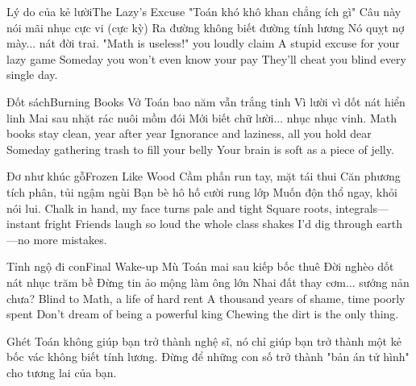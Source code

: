 \begin{tutuyetbox}{Lý do của kẻ lười}{The Lazy's Excuse}
"Toán khó khô khan chẳng ích gì"
Câu này nói mãi nhục cực vi (cực kỳ)
Ra đường không biết đường tính lương
Nó quỵt nợ mày... nát đời trai.
\tcblower
"Math is useless!" you loudly claim
A stupid excuse for your lazy game
Someday you won't even know your pay
They'll cheat you blind every single day.
\end{tutuyetbox}

\begin{tutuyetbox}{Đốt sách}{Burning Books}
Vở Toán bao năm vẫn trắng tinh
Vì lười vì dốt nát hiển linh
Mai sau nhặt rác nuôi mồm đói
Mới biết chữ lười... nhục nhục vinh.
\tcblower
Math books stay clean, year after year
Ignorance and laziness, all you hold dear
Someday gathering trash to fill your belly
Your brain is soft as a piece of jelly.
\end{tutuyetbox}

\begin{tutuyetbox}{Đơ như khúc gỗ}{Frozen Like Wood}
Cầm phấn run tay, mặt tái thui
Căn phương tích phân, tủi ngậm ngùi
Bạn bè hô hố cười rung lớp
Muốn độn thổ ngay, khỏi nói lui.
\tcblower
Chalk in hand, my face turns pale and tight
Square roots, integrals—instant fright
Friends laugh so loud the whole class shakes
I’d dig through earth—no more mistakes.
\end{tutuyetbox}

\begin{tutuyetbox}{Tỉnh ngộ đi con}{Final Wake-up}
Mù Toán mai sau kiếp bốc thuê
Đời nghèo dốt nát nhục trăm bề
Đừng tin ảo mộng làm ông lớn
Nhai đất thay cơm... sướng nản chưa?
\tcblower
Blind to Math, a life of hard rent
A thousand years of shame, time poorly spent
Don't dream of being a powerful king
Chewing the dirt is the only thing.
\end{tutuyetbox}
\begin{ghichu}
Ghét Toán không giúp bạn trở thành nghệ sĩ, nó chỉ giúp bạn trở thành một kẻ bốc vác không biết tính lương. Đừng để những con số trở thành "bản án tử hình" cho tương lai của bạn.
\end{ghichu}